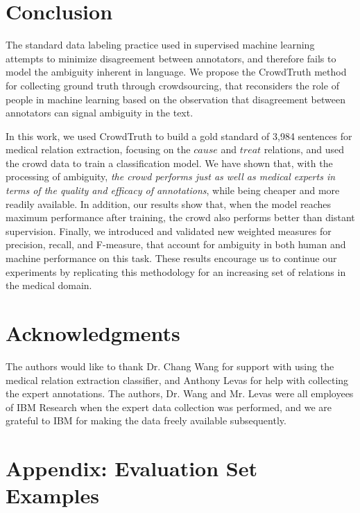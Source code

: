 \section{Conclusion}

The standard data labeling practice used in supervised machine learning attempts to minimize disagreement between annotators, and therefore fails to model the ambiguity inherent in language. We propose the CrowdTruth method for collecting ground truth through crowdsourcing, that reconsiders the role of people in machine learning based on the observation that disagreement between annotators can signal ambiguity in the text.

In this work, we used CrowdTruth to build a gold standard of 3,984 sentences for medical relation extraction, focusing on the $cause$ and $treat$ relations, and used the crowd data to train a classification model. We have shown that, with the processing of ambiguity, \textit{the crowd performs just as well as medical experts in terms of the quality and efficacy of annotations}, while being cheaper and more readily available. In addition, our results show that, when the model reaches maximum performance after training, the crowd also performs better than distant supervision. Finally, we introduced and validated new weighted measures for precision, recall, and F-measure, that account for ambiguity in both human and machine performance on this task. These results encourage us to continue our experiments by replicating this methodology for an increasing set of relations in the medical domain.


\section*{Acknowledgments}

The authors would like to thank Dr. Chang Wang for support with using the medical relation extraction classifier, and Anthony Levas for help with collecting the expert annotations.  The authors, Dr. Wang and Mr. Levas were all employees of IBM Research when the expert data collection was performed, and we are grateful to IBM for making the data freely available subsequently.

\newpage

\section{Appendix: Evaluation Set Examples}

